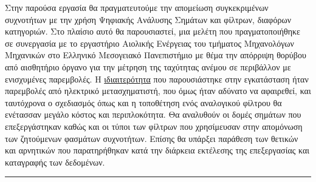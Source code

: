 \documentclass[breaklines=true, 12pt]{article}
\begin{document}
Στην παρούσα εργασία θα πραγματευτούμε την απομείωση συγκεκριμένων
συχνοτήτων με την χρήση Ψηφιακής Ανάλυσης Σημάτων και φίλτρων, διαφόρων
κατηγοριών. Στο πλαίσιο αυτό θα παρουσιαστεί, μια μελέτη που
πραγματοποιήθηκε σε συνεργασία με το εργαστήριο Αιολικής Ενέργειας του
τμήματος Μηχανολόγων Μηχανικών στο Ελληνικό Μεσογειακό Πανεπιστήμιο με
θέμα την απόρριψη θορύβου από αισθητήριο όργανο για την μέτρηση της
ταχύτητας ανέμου σε περιβάλλον με ενισχυμένες παρεμβολές. Η
\uline{ιδιαιτερότητα} που παρουσιάστηκε στην εγκατάσταση ήταν παρεμβολές από
ηλεκτρικό μετασχηματιστή, που όμως ήταν αδύνατο να
αφαιρεθεί, και ταυτόχρονα ο σχεδιασμός όπως και η τοποθέτηση ενός
αναλογικού φίλτρου θα ενέτασσαν μεγάλο κόστος και περιπλοκότητα. Θα
αναλυθούν οι δομές σημάτων που επεξεργάστηκαν καθώς και οι τύποι των
φίλτρων που χρησίμευσαν στην απομόνωση των ζητούμενων φασμάτων συχνοτήτων.
Επίσης θα υπάρξει παράθεση των θετικών και αρνητικών που παρατηρήθηκαν κατά την
διάρκεια εκτέλεσης της επεξεργασίας και καταγραφής των δεδομένων.

\noindent\rule{\textwidth}{0.5pt}
\end{document}
